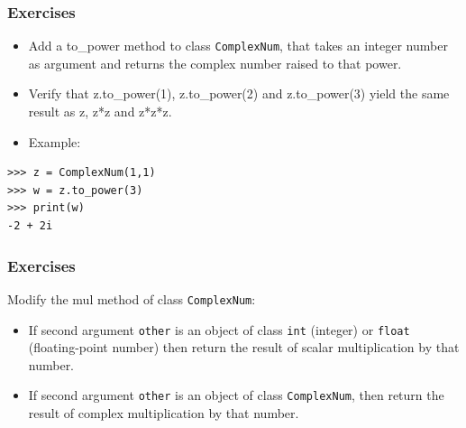 \begin{frame}[fragile]\frametitle{Exercises}
\begin{itemize}
\item Add a to\_power method to class \texttt{ComplexNum},
    that takes an integer number as argument and returns the complex
    number raised to that power.

\item
Verify that z.to\_power(1),
    z.to\_power(2) and z.to\_power(3) yield the
    same result as z, z*z and
    z*z*z.

\item
    Example:
\end{itemize}
\begin{lstlisting}
>>> z = ComplexNum(1,1)
>>> w = z.to_power(3)
>>> print(w)
-2 + 2i
\end{lstlisting}
\end{frame}



\begin{frame}[fragile]\frametitle{Exercises}
    Modify the mul method of class \texttt{ComplexNum}:
    \begin{itemize}
    \item If second argument \texttt{other} is an object of class
      \texttt{int} (integer) or \texttt{float} (floating-point
      number) then return the result of scalar multiplication by that number.
    \item If second argument \texttt{other} is an object of class
      \texttt{ComplexNum}, then return the result of complex
      multiplication by that number.
    \end{itemize}
\end{frame}

